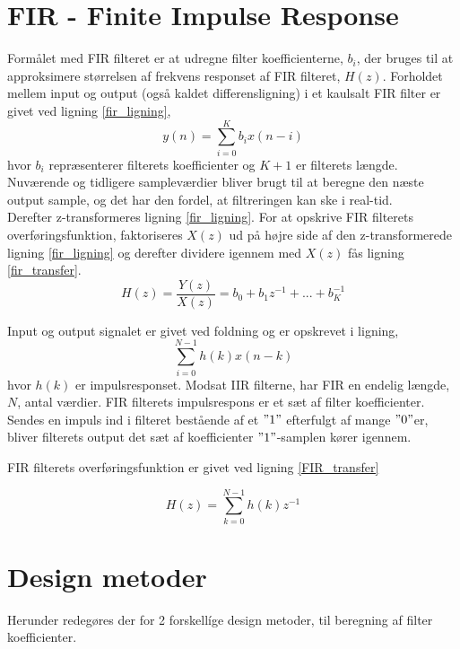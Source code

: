 \section{FIR - Finite Impulse Response}\label{sec:fir}
Formålet med FIR filteret er at udregne filter koefficienterne, $b_{i}$, der bruges til at approksimere størrelsen af frekvens responset af FIR filteret, $H(z)$.
Forholdet mellem input og output (også kaldet differensligning) i et kaulsalt FIR filter er givet ved ligning \ref{fir_ligning},
\begin {equation} 
y(n)=\sum\limits_{i=0}^{K}b_{i}x(n-i) \label{fir_ligning}
\end {equation}
hvor $b_{i}$ repræsenterer filterets koefficienter og $K+1$ er filterets længde. Nuværende og tidligere sampleværdier bliver brugt til at beregne den næste output sample, og det har den fordel, at filtreringen kan ske i real-tid.
\\
Derefter z-transformeres ligning \ref{fir_ligning}. For at opskrive FIR filterets overføringsfunktion, faktoriseres $X(z)$ ud på højre side af den z-transformerede ligning \ref{fir_ligning} og derefter dividere igennem med $X(z)$ fås ligning \ref{fir_transfer}.
\begin {equation}
H(z)=\frac{Y(z)}{X(z)}=b_{0}+b_{1}z^{-1}+...+b_{K}^{-1} \label{fir_transfer}
\end {equation}

Input og output signalet er givet ved foldning og er opskrevet i ligning,
\begin {equation} 
\sum\limits_{i=0}^{N-1} h(k)x(n-k) 
\end {equation}
hvor $h(k)$ er impulsresponset. Modsat IIR filterne, har FIR en endelig længde, $N$, antal værdier. FIR filterets impulsrespons er et sæt af filter koefficienter. Sendes en impuls ind i filteret bestående af et $"1"$ efterfulgt af mange $"0"$er, bliver filterets output det sæt af koefficienter $"1"$-samplen kører igennem. 


FIR filterets overføringsfunktion er givet ved ligning \ref{FIR_transfer}

\begin {equation}
H(z)=\sum\limits_{k=0}^{N-1}h(k)z^{-1} \label{FIR_transfer}
\end {equation}

\section{Design metoder} \label{sec:fir_design}
Herunder redegøres der for 2 forskellíge design metoder, til beregning af filter koefficienter.
